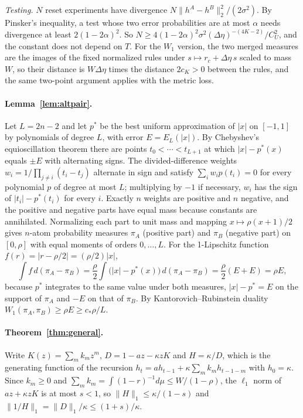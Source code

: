 \documentclass[12pt]{article}
\theoremstyle{definition}
\theoremstyle{remark}
\begin{document}
\emph{Testing.} $N$ reset experiments have divergence $N\|h^A-h^B\|_2^2/(2\sigma^2)$. By Pinsker's inequality, a test whose two error probabilities are at most $\alpha$ needs divergence at least $2(1-2\alpha)^2$. So $N\ge4(1-2\alpha)^2\sigma^2(\Delta\eta)^{-(4K-2)}/C_U^2$, and the constant does not depend on $T$. For the $W_1$ version, the two merged measures are the images of the fixed normalized rules under $s\mapsto r_c+\Delta\eta\,s$ scaled to mass $W$, so their distance is $W\Delta\eta$ times the distance $2c_K>0$ between the rules, and the same two-point argument applies with the metric loss.

\paragraph{Lemma~\ref{lem:altpair}.} Let $L=2n-2$ and let $p^*$ be the best uniform approximation of $|x|$ on $[-1,1]$ by polynomials of degree $L$, with error $E=E_L(|x|)$. By Chebyshev's equioscillation theorem \citep{rivlin1981} there are points $t_0<\cdots<t_{L+1}$ at which $|x|-p^*(x)$ equals $\pm E$ with alternating signs. The divided-difference weights $w_i=1/\prod_{j\ne i}(t_i-t_j)$ alternate in sign and satisfy $\sum_iw_ip(t_i)=0$ for every polynomial $p$ of degree at most $L$; multiplying by $-1$ if necessary, $w_i$ has the sign of $|t_i|-p^*(t_i)$ for every $i$. Exactly $n$ weights are positive and $n$ negative, and the positive and negative parts have equal mass because constants are annihilated. Normalizing each part to unit mass and mapping $x\mapsto\rho(x+1)/2$ gives $n$-atom probability measures $\pi_A$ (positive part) and $\pi_B$ (negative part) on $[0,\rho]$ with equal moments of orders $0,\ldots,L$. For the 1-Lipschitz function $f(r)=|r-\rho/2|=(\rho/2)|x|$,
\[
\int f\,d(\pi_A-\pi_B)=\frac\rho2\int\bigl(|x|-p^*(x)\bigr)\,d(\pi_A-\pi_B)=\frac\rho2(E+E)=\rho E ,
\]
because $p^*$ integrates to the same value under both measures, $|x|-p^*=E$ on the support of $\pi_A$ and $-E$ on that of $\pi_B$. By Kantorovich--Rubinstein duality $W_1(\pi_A,\pi_B)\ge\rho E\ge c_*\rho/L$.

\paragraph{Theorem~\ref{thm:general}.} Write $K(z)=\sum_mk_mz^m$, $D=1-az-\kappa zK$ and $H=\kappa/D$, which is the generating function of the recursion $h_t=ah_{t-1}+\kappa\sum_mk_mh_{t-1-m}$ with $h_0=\kappa$. Since $k_m\ge0$ and $\sum_mk_m=\int(1-r)^{-1}d\mu\le W/(1-\rho)$, the $\ell_1$ norm of $az+\kappa zK$ is at most $s<1$, so $\|H\|_1\le\kappa/(1-s)$ and $\|1/H\|_1=\|D\|_1/\kappa\le(1+s)/\kappa$.
\end{document}
